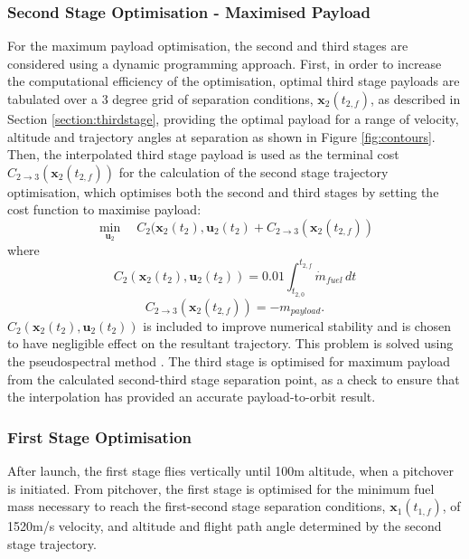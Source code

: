 \documentclass[journal]{new-aiaa}
\begin{document}
	 	 \subsubsection{Second Stage Optimisation - Maximised Payload}
	 For the maximum payload optimisation, the second and third stages are considered using a dynamic programming approach. First, in order to increase the computational efficiency of the optimisation, optimal third stage payloads are tabulated  over a 3 degree grid of separation conditions, $\textbf{x}_2(t_{2,f})$, as described in Section \ref{section:thirdstage}, providing the optimal payload for a range of velocity, altitude and trajectory angles at separation as shown in Figure \ref{fig:contours}. Then, the interpolated third stage payload is used as the terminal cost $C_{2 \rightarrow 3}(\textbf{x}_2(t_{2,f}))$ for the calculation of the second stage trajectory optimisation, which optimises both the second and third stages by setting the cost function to maximise payload:
	  \begin{equation}
	  \min\limits_{\textbf{u}_2} \quad C_2(\textbf{x}_{2}(t_2),\textbf{u}_{2}(t_2) + C_{2 \rightarrow 3}(\textbf{x}_2 (t_{2,f}))
	  \end{equation}
	  where
	  \begin{equation}
	  C_2(\textbf{x}_{2}(t_2),\textbf{u}_{2}(t_2)) = 0.01\int_{t_{2,0}}^{t_{2,f}}\dot{m}_{fuel} \, dt
	  \end{equation}
	  \begin{equation}
	  C_{2 \rightarrow 3}(\textbf{x}_2(t_{2,f})) = -m_{payload}.
	  \end{equation}
	   $C_{2}(\textbf{x}_{2}(t_2),\textbf{u}_{2}(t_2))$ is included to improve numerical stability and is chosen to have negligible effect on the resultant trajectory.
	 This problem is solved using the pseudospectral method \cite{Ross2004}. 
	 The third stage is optimised for maximum payload from the calculated second-third stage separation point, as a check to ensure that the interpolation has provided an accurate payload-to-orbit result. 
	 
  

\subsubsection{First Stage Optimisation}
After launch, the first stage flies vertically until 100m altitude, when a pitchover is initiated. 
From pitchover, the first stage is optimised for the minimum fuel mass necessary to reach the first-second stage separation conditions, $\textbf{x}_1(t_{1,f})$, of 1520m/s velocity, and altitude and flight path angle determined by the second stage trajectory. 
\end{document}
